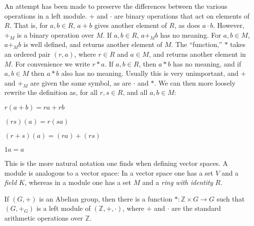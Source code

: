     An attempt has been made to preserve the differences
    between the various operations in a left module.
    $+$ and $\cdot$ are binary operations that act on
    elements of $R$. That is, for $a,b\in{R}$, $a+b$
    gives another element of $R$, as does $a\cdot{b}$.
    However, $+_{M}$ is a binary operation over
    $M$. If $a,b\in{R}$, $a+_{M}b$ has no meaning.
    For $a,b\in{M}$, $a+_{M}b$ is well defined, and returns
    another element of $M$. The ``function,'' $*$
    takes an ordered pair $(r,a)$, where $r\in{R}$ and
    $a\in{M}$, and returns another element in $M$. For
    convenience we write $r*a$. If $a,b\in{R}$, then
    $a*b$ has no meaning, and if $a,b\in{M}$ then
    $a*b$ also has no meaning. Usually this is very
    unimportant, and $+$ and $+_{M}$ are given the same
    symbol, as are $\cdot$ and $*$. We can then more loosely
    rewrite the definition as, for all $r,s\in{R}$, and
    all $a,b\in{M}$:
    \begin{enumerate}
        \begin{multicols}{2}
            \item $r(a+b)=ra+rb$
            \item $(rs)(a)=r(sa)$
            \item $(r+s)(a)=(ra)+(rs)$
            \item $1a=a$
        \end{multicols}
    \end{enumerate}
    This is the more natural notation one finds when defining
    vector spaces. A module is analogous to a vector space:
    In a vector space one has a set $V$ and a
    \textit{field} $K$, whereas in a module one has a set
    $M$ and a \textit{ring with identity} $R$.
    \begin{theorem}
        If $(G,+)$ is an Abelian group, then there is a
        function $*:\mathbb{Z}\times{G}\rightarrow{G}$
        such that $(G,+_{G})$ is a left module of
        $(\mathbb{Z},+,\cdot)$, where $+$ and $\cdot$ are
        the standard arithmetic operations over $\mathbb{Z}$.
    \end{theorem}
